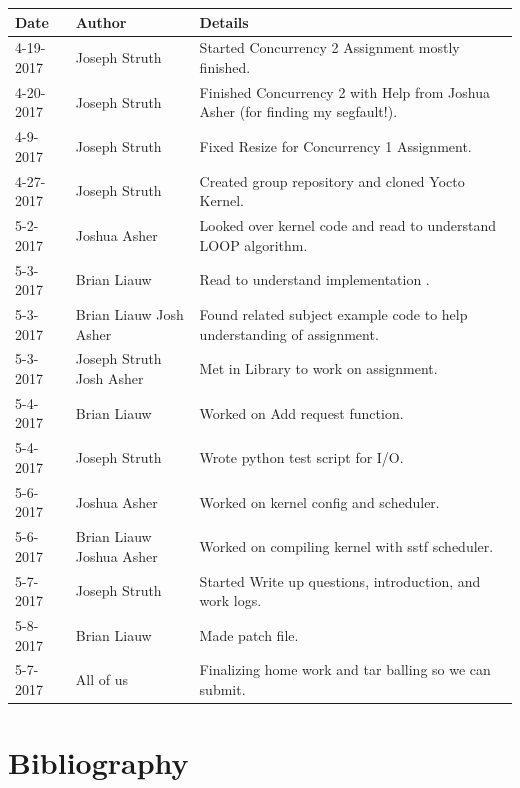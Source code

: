 \documentclass[10pt,draftclsnofoot,onecolumn, compsoc]{IEEEtran}
\begin{document}
\begin{tabular}{| l | l | p{15cm} |}\textbf{Date} & \textbf{Author} & \textbf{Details}\\\hline
4-19-2017 & Joseph Struth & Started Concurrency 2 Assignment mostly finished.\\\hline
4-20-2017 & Joseph Struth & Finished Concurrency 2 with Help from Joshua Asher (for finding my segfault!).\\\hline
4-9-2017 & Joseph Struth & Fixed Resize for Concurrency 1 Assignment.\\\hline
4-27-2017 & Joseph Struth & Created group repository and cloned Yocto Kernel.\\\hline
5-2-2017 & Joshua Asher & Looked over kernel code and read to understand LOOP algorithm.\\\hline
5-3-2017 & Brian Liauw & Read to understand implementation .\\\hline
5-3-2017 & Brian Liauw Josh Asher & Found related subject example code to help understanding of assignment.\\\hline
5-3-2017 & Joseph Struth Josh Asher & Met in Library to work on assignment.\\\hline
5-4-2017 & Brian Liauw & Worked on Add request function.\\\hline
5-4-2017 & Joseph Struth & Wrote python test script for I/O.\\\hline
5-6-2017 & Joshua Asher & Worked on kernel config and scheduler.\\\hline
5-6-2017 & Brian Liauw Joshua Asher & Worked on compiling kernel with sstf scheduler.\\\hline
5-7-2017 & Joseph Struth & Started Write up questions, introduction, and work logs.\\\hline
5-8-2017 & Brian Liauw & Made patch file.\\\hline
5-7-2017 & All of us & Finalizing home work and tar balling so we can submit.\\\hline
\end{tabular}

\section{Bibliography}
\nocite{*}


\end{document}
